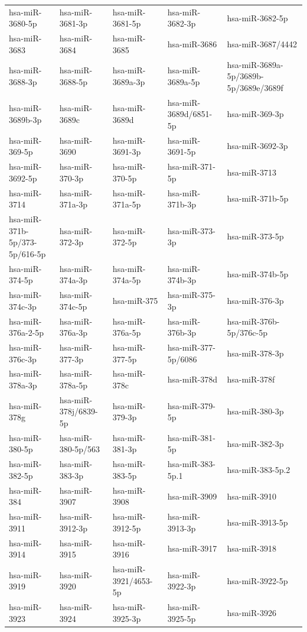 \begin{longtable}{lllll}
hsa-miR-3680-5p & hsa-miR-3681-3p & hsa-miR-3681-5p & hsa-miR-3682-3p & hsa-miR-3682-5p \\
hsa-miR-3683 & hsa-miR-3684 & hsa-miR-3685 & hsa-miR-3686 & hsa-miR-3687/4442 \\
hsa-miR-3688-3p & hsa-miR-3688-5p & hsa-miR-3689a-3p & hsa-miR-3689a-5p & hsa-miR-3689a-5p/3689b-5p/3689e/3689f \\
hsa-miR-3689b-3p & hsa-miR-3689c & hsa-miR-3689d & hsa-miR-3689d/6851-5p & hsa-miR-369-3p \\
hsa-miR-369-5p & hsa-miR-3690 & hsa-miR-3691-3p & hsa-miR-3691-5p & hsa-miR-3692-3p \\
hsa-miR-3692-5p & hsa-miR-370-3p & hsa-miR-370-5p & hsa-miR-371-5p & hsa-miR-3713 \\
hsa-miR-3714 & hsa-miR-371a-3p & hsa-miR-371a-5p & hsa-miR-371b-3p & hsa-miR-371b-5p \\
hsa-miR-371b-5p/373-5p/616-5p & hsa-miR-372-3p & hsa-miR-372-5p & hsa-miR-373-3p & hsa-miR-373-5p \\
hsa-miR-374-5p & hsa-miR-374a-3p & hsa-miR-374a-5p & hsa-miR-374b-3p & hsa-miR-374b-5p \\
hsa-miR-374c-3p & hsa-miR-374c-5p & hsa-miR-375 & hsa-miR-375-3p & hsa-miR-376-3p \\
hsa-miR-376a-2-5p & hsa-miR-376a-3p & hsa-miR-376a-5p & hsa-miR-376b-3p & hsa-miR-376b-5p/376c-5p \\
hsa-miR-376c-3p & hsa-miR-377-3p & hsa-miR-377-5p & hsa-miR-377-5p/6086 & hsa-miR-378-3p \\
hsa-miR-378a-3p & hsa-miR-378a-5p & hsa-miR-378c & hsa-miR-378d & hsa-miR-378f \\
hsa-miR-378g & hsa-miR-378j/6839-5p & hsa-miR-379-3p & hsa-miR-379-5p & hsa-miR-380-3p \\
hsa-miR-380-5p & hsa-miR-380-5p/563 & hsa-miR-381-3p & hsa-miR-381-5p & hsa-miR-382-3p \\
hsa-miR-382-5p & hsa-miR-383-3p & hsa-miR-383-5p & hsa-miR-383-5p.1 & hsa-miR-383-5p.2 \\
hsa-miR-384 & hsa-miR-3907 & hsa-miR-3908 & hsa-miR-3909 & hsa-miR-3910 \\
hsa-miR-3911 & hsa-miR-3912-3p & hsa-miR-3912-5p & hsa-miR-3913-3p & hsa-miR-3913-5p \\
hsa-miR-3914 & hsa-miR-3915 & hsa-miR-3916 & hsa-miR-3917 & hsa-miR-3918 \\
hsa-miR-3919 & hsa-miR-3920 & hsa-miR-3921/4653-5p & hsa-miR-3922-3p & hsa-miR-3922-5p \\
hsa-miR-3923 & hsa-miR-3924 & hsa-miR-3925-3p & hsa-miR-3925-5p & hsa-miR-3926 \\

\end{longtable}
